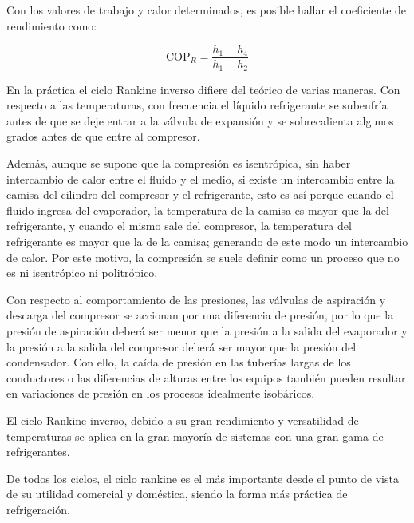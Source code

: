 	Con los valores de trabajo y calor determinados, es posible hallar el coeficiente de rendimiento como:

	\begin{equation}\label{E1-COP para un ciclo Rankine inverso}
		\text{COP}_{R} = \dfrac{h_1 - h_4}{h_1 - h_2}
	\end{equation}
	
	En la práctica el ciclo Rankine inverso difiere del teórico de varias maneras. Con respecto a las temperaturas, con frecuencia el líquido refrigerante se subenfría antes de que se deje entrar a la válvula de expansión y se sobrecalienta algunos grados antes de que entre al compresor. 
	
	
	Además, aunque se supone que la compresión es isentrópica, sin haber intercambio de calor entre el fluido y el medio, si existe un intercambio entre la camisa del cilindro del compresor y el refrigerante, esto es así porque cuando el fluido ingresa del evaporador, la temperatura de la camisa es mayor que la del refrigerante, y cuando el mismo sale del compresor, la temperatura del refrigerante es mayor que la de la camisa; generando de este modo un intercambio de calor. Por este motivo, la compresión se suele definir como un proceso que no es ni isentrópico ni politrópico.

	Con respecto al comportamiento de las presiones, las válvulas de aspiración y descarga del compresor se accionan por una diferencia de presión, por lo que la presión de aspiración deberá ser menor que la presión a la salida del evaporador y la presión a la salida del compresor deberá ser mayor que la presión del condensador. Con ello, la caída de presión en las tuberías largas de los conductores o las diferencias de alturas entre los equipos también pueden resultar en variaciones de presión en los procesos idealmente isobáricos.

	
	El ciclo Rankine inverso, debido a su gran rendimiento y versatilidad de temperaturas se aplica en la gran mayoría de sistemas con una gran gama de refrigerantes. 

	De todos los ciclos, el ciclo rankine es el más importante desde el punto de vista de su utilidad comercial y doméstica, siendo la forma más práctica de refrigeración. 

	



